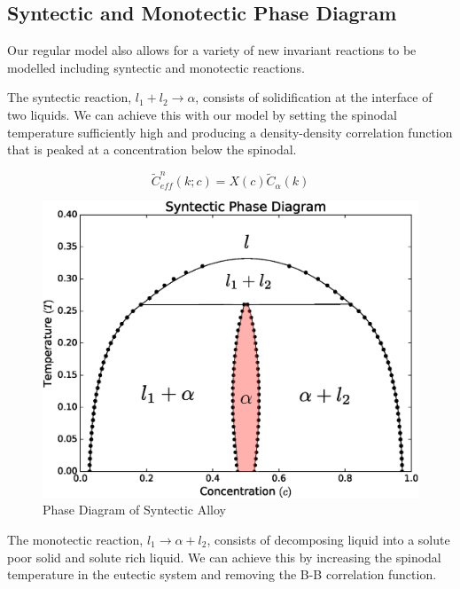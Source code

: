 \documentclass[showkeys, reprint]{revtex4-1}
\begin{document}
\subsection{Syntectic and Monotectic Phase Diagram}

Our regular model also allows for a variety of new invariant reactions to be modelled including syntectic and monotectic reactions.

The syntectic reaction, $l_1 + l_2 \rightarrow \alpha $, consists of solidification at the interface of two liquids. We can achieve this with our model by setting the spinodal temperature sufficiently high and producing a density-density correlation function that is peaked at a concentration below the spinodal.

\begin{equation}
	\tilde{C}^n_{eff}(k; c) = X(c) \tilde{C}_{\alpha}(k)
\end{equation}

\begin{figure}
	\includegraphics[scale=0.3]{syntectic.eps}
	\caption{\label{syntectic} Phase Diagram of Syntectic Alloy}
\end{figure}

The monotectic reaction, $l_1 \rightarrow \alpha + l_2$, consists of decomposing liquid into a solute poor solid and solute rich liquid. We can achieve this by increasing the spinodal temperature in the eutectic system and removing the B-B correlation function.
\end{document}
